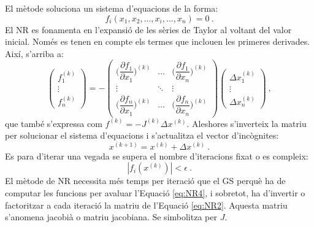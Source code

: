 El mètode soluciona un sistema d'equacions de la forma:
\begin{equation}
    f_i(x_1, x_2, ..., x_i, ..., x_n)=0\ .
\label{eq:NR1}
\end{equation}
El NR es fonamenta en l'expansió de les sèries de Taylor al voltant del valor inicial. Només es tenen en compte els termes que inclouen les primeres derivades. 
Així, s'arriba a:
\begin{equation}
    \begin{pmatrix}
        f^{(k)}_1\\
        \vdots\\
        f^{(k)}_n
    \end{pmatrix}
    = - \begin{pmatrix}
        \biggl(\dfrac{\partial f_1}{\partial x_1}\biggr)^{(k)} & \dots & \biggl(\dfrac{\partial f_1}{\partial x_n}\biggr)^{(k)} \\
        \vdots & \ddots & \vdots\\
        \biggl(\dfrac{\partial f_n}{\partial x_1}\biggr)^{(k)} & \dots & \biggl(\dfrac{\partial f_n}{\partial x_n}\biggr)^{(k)}
    \end{pmatrix}
    \begin{pmatrix}
        \Delta x^{(k)}_1 \\
        \vdots \\
        \Delta x^{(k)}_n
    \end{pmatrix}\ ,
\label{eq:NR2}
\end{equation}
que també s'expressa com $f^{(k)}=-J^{(k)}\Delta x^{(k)}$. Aleshores s'inverteix la matriu per solucionar el sistema d'equacions i s'actualitza el vector d'incògnites:
\begin{equation}
    x^{(k+1)}=x^{(k)} + \Delta x^{(k)}
\label{eq:NR3}\ .
\end{equation}
Es para d'iterar una vegada se supera el nombre d'iteracions fixat o es compleix:
\begin{equation}
    |f_i(x^{(k)})|<\epsilon
\label{eq:NR4}\ .
\end{equation}
El mètode de NR necessita més temps per iteració que el GS perquè ha de computar les funcions per avaluar l'Equació \ref{eq:NR4}, i sobretot, ha d'invertir o factoritzar a cada iteració la matriu de l'Equació \ref{eq:NR2}. Aquesta matriu s'anomena jacobià o matriu jacobiana. Se simbolitza per $J$.

